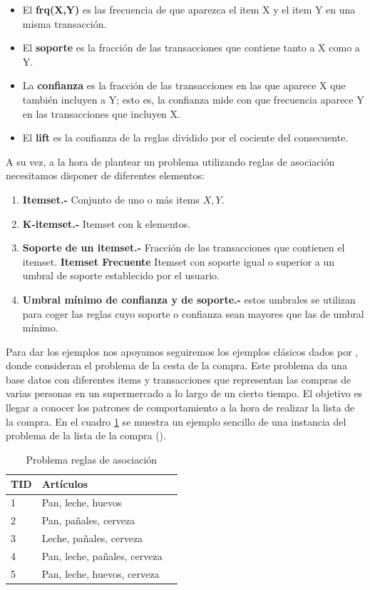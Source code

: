 \documentclass{cosas/tfg_domingo}
\begin{document}
\begin{itemize}
    \item El \textbf{frq(X,Y)} es las frecuencia de que aparezca el item X y el item Y en una misma transacción.
    \item El \textbf{soporte} es la fracción de las transacciones que contiene tanto a X como a Y. 
    \item La \textbf{confianza} es la fracción de las transacciones en las que aparece X que también incluyen a Y; esto es, la confianza mide con que frecuencia aparece Y en las transacciones que incluyen X.
    \item El \textbf{lift} es la confianza de la reglas dividido por el cociente del consecuente.
\end{itemize}

A su vez, a la hora de plantear un problema utilizando reglas de asociación necesitamos disponer de diferentes elementos:  

\begin{enumerate}
    \item \textbf{Itemset.- } Conjunto de uno o más items $X, Y$.
    \item \textbf{K-itemset.- } Itemset con k elementos.
    \item \textbf{Soporte de un itemset.- } Fracción de las transacciones que contienen el itemset.
    \textbf{Itemset Frecuente} Itemset con soporte igual o superior a un umbral de soporte establecido por el usuario. 
    \item \textbf{Umbral mínimo de confianza y de soporte.- } estos umbrales se utilizan para coger las reglas cuyo soporte o confianza sean mayores que las de umbral mínimo.
\end{enumerate}

Para dar los ejemplos nos apoyamos seguiremos los ejemplos clásicos dados por \citep{agrawal1993mining}, donde consideran el problema de la cesta de la compra. Este problema da una base datos con diferentes items y transacciones que representan las compras de varias personas en un supermercado a lo largo de un cierto tiempo. El objetivo es llegar a conocer los patrones de comportamiento a la hora de realizar la lista de la compra.
En el cuadro \ref{prob_asoc} se muestra un ejemplo sencillo de una instancia del problema de la lista de la compra (\citet{datamining}).
\newpage

\begin{table}[h]
\centering
\begin{tabular}{|l|l|l|}
\hline
TID & Artículos                     \\ \hline
1         & Pan, leche, huevos            \\ \hline
2         & Pan, pañales, cerveza            \\ \hline
3         & Leche, pañales, cerveza            \\ \hline
4         & Pan, leche, pañales, cerveza         \\ \hline
5         & Pan, leche, huevos, cerveza         \\ \hline
\end{tabular}
\caption{Problema reglas de asociación}
\label{prob_asoc}
\end{table}
\end{document}
